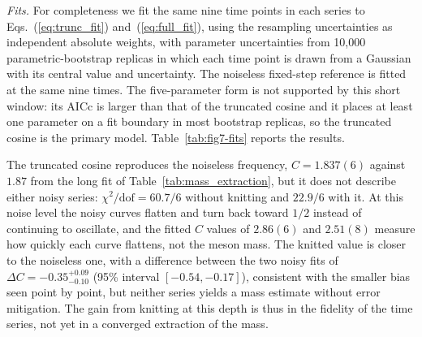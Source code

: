 \noindent\textit{Fits.}\quad
For completeness we fit the same nine time points in each series to
Eqs.~(\ref{eq:trunc_fit}) and~(\ref{eq:full_fit}), using the resampling
uncertainties as independent absolute weights, with parameter uncertainties
from 10,000 parametric-bootstrap replicas in which each time point is drawn
from a Gaussian with its central value and uncertainty.  The noiseless
fixed-step reference is fitted at the same nine times.  The five-parameter
form is not supported by this short window: its AICc is larger than that of
the truncated cosine and it places at least one parameter on a fit boundary
in most bootstrap replicas, so the truncated cosine is the primary model.
Table~\ref{tab:fig7-fits} reports the results.



The truncated cosine reproduces the noiseless frequency,
$C=1.837(6)$ against $1.87$ from the long fit of
Table~\ref{tab:mass_extraction}, but it does not describe either noisy
series: $\chi^2/\mathrm{dof}=60.7/6$ without knitting and $22.9/6$ with it.
At this noise level the noisy curves flatten and turn back toward $1/2$
instead of continuing to oscillate, and the fitted $C$ values of $2.86(6)$
and $2.51(8)$ measure how quickly each curve flattens, not the meson mass.
The knitted value is closer to the noiseless one, with a difference between
the two noisy fits of $\Delta C=-0.35^{+0.09}_{-0.10}$ (95\% interval
$[-0.54,-0.17]$), consistent with the smaller bias seen point by point, but
neither series yields a mass estimate without error mitigation.  The gain
from knitting at this depth is thus in the fidelity of the time series, not
yet in a converged extraction of the mass.
